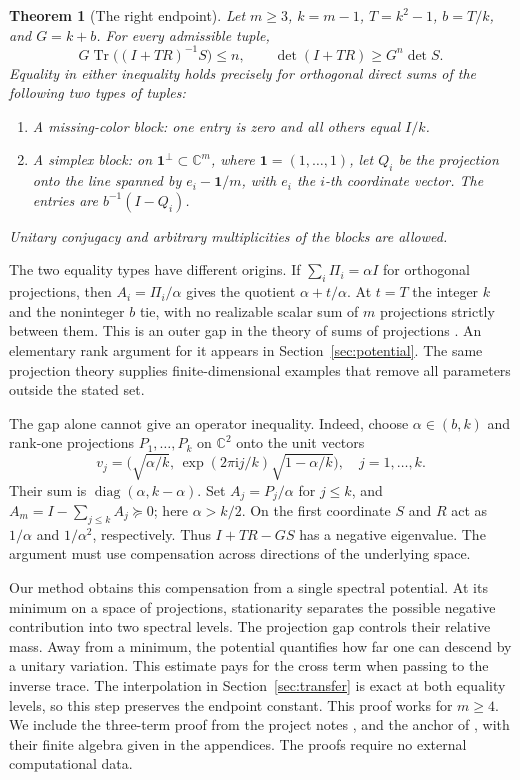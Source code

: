 \documentclass[11pt]{article}
\newtheorem{theorem}{Theorem}
\newcommand{\Tr}{\operatorname{Tr}}
\begin{document}
\begin{theorem}[The right endpoint]\label{th:endpoint}
Let \(m\ge3\), \(k=m-1\), \(T=k^2-1\), \(b=T/k\), and \(G=k+b\).
For every admissible tuple,
\begin{equation}\label{eq:upper}
G\Tr\big((I+TR)^{-1}S\big)\le n,\qquad
\det(I+TR)\ge G^n\det S.
\end{equation}
Equality in either inequality holds precisely for orthogonal direct sums
of the following two types of tuples:
\begin{enumerate}
\item A missing-color block: one entry is zero and all others equal \(I/k\).
\item A simplex block: on \(\mathbf 1^\perp\subset\mathbb C^m\), where
\(\mathbf 1=(1,\ldots,1)\), let \(Q_i\) be the projection onto the
line spanned by \(e_i-\mathbf 1/m\), with \(e_i\) the \(i\)-th coordinate
vector. The entries are \(b^{-1}(I-Q_i)\).
\end{enumerate}
Unitary conjugacy and arbitrary multiplicities of the blocks are allowed.
\end{theorem}

The two equality types have different origins. If \(\sum_i\Pi_i=\alpha I\)
for orthogonal projections, then \(A_i=\Pi_i/\alpha\) gives the quotient
\(\alpha+t/\alpha\). At \(t=T\) the integer \(k\) and the noninteger \(b\)
tie, with no realizable scalar sum of \(m\) projections strictly between them.
This is an outer gap in the theory of sums of projections \cite{krs}. An
elementary rank argument for it appears in Section~\ref{sec:potential}.
The same projection theory supplies finite-dimensional examples that
remove all parameters outside the stated set.

The gap alone cannot give an operator inequality. Indeed, choose
\(\alpha\in(b,k)\) and rank-one projections \(P_1,\ldots,P_k\) on
\(\mathbb C^2\) onto the unit vectors
\[
v_j=\big(\sqrt{\alpha/k},\,\exp(2\pi\mathrm{i}j/k)\sqrt{1-\alpha/k}\big),
\quad j=1,\ldots,k.
\]
Their sum is \(\operatorname{diag}(\alpha,k-\alpha)\). Set \(A_j=P_j/\alpha\)
for \(j\le k\), and \(A_m=I-\sum_{j\le k}A_j\succeq0\); here \(\alpha>k/2\).
On the first coordinate \(S\) and \(R\) act as \(1/\alpha\) and
\(1/\alpha^2\), respectively. Thus \(I+TR-GS\) has a negative eigenvalue.
The argument must use compensation across directions of the underlying
space.

Our method obtains this compensation from a single spectral potential.
At its minimum on a space of projections, stationarity separates the
possible negative contribution into two spectral levels. The projection
gap controls their relative mass. Away from a minimum, the potential
quantifies how far one can descend by a unitary variation. This estimate
pays for the cross term when passing to the inverse trace. The
interpolation in Section~\ref{sec:transfer} is exact at both equality
levels, so this step preserves the endpoint constant.
This proof works for \(m\ge4\). We include the three-term proof from the
project notes \cite{round8}, and the anchor of \cite{anchor}, with their
finite algebra given in the appendices. The proofs require no external
computational data.
\end{document}
